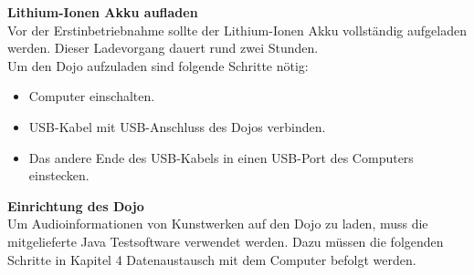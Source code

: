 \textbf{Lithium-Ionen Akku aufladen}
\\[4mm]
Vor der Erstinbetriebnahme sollte der Lithium-Ionen Akku vollständig aufgeladen werden. Dieser Ladevorgang dauert rund zwei Stunden.
\\[4mm]
Um den Dojo aufzuladen sind folgende Schritte nötig:
\begin{itemize}
\item Computer einschalten.
\end{itemize}
\begin{itemize}
\item USB-Kabel mit USB-Anschluss des Dojos verbinden.
\end{itemize}
\begin{itemize}
\item Das andere Ende des USB-Kabels in einen USB-Port des Computers einstecken.
\end{itemize}
\textbf{Einrichtung des Dojo}
\\[4mm]
Um Audioinformationen von Kunstwerken auf den Dojo zu laden, muss die mitgelieferte Java Testsoftware verwendet werden. Dazu müssen die folgenden Schritte in Kapitel 4 Datenaustausch mit dem Computer befolgt werden.